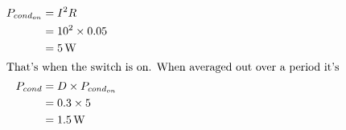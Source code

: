\subsection{}

\begin{align*}
P_{cond_{on}} & = I^2 R \\
  & = 10^2 \times 0.05 \\
  & = \unit[5]{W} \\
\intertext{That's when the switch is on. When averaged out over a period it's}
P_{cond} & = D \times P_{cond_{on}} \\
         & = 0.3 \times 5 \\
         & = \unit[1.5]{W}
\end{align*}